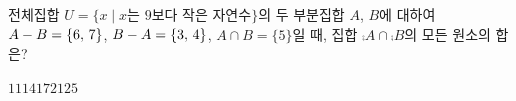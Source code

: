 전체집합 $U=\{x \mid x$는 $9$보다 작은 자연수$\}$의 두 부분집합 $A$, $B$에 대하여 $A-B=\{6,\mkern3mu 7\}$, $B-A=\{3,\mkern3mu 4\}$, $A\cap B=\{5\}$일 때, 집합 $\comp{A}\cap\comp{B}$의 모든 원소의 합은?
\begin{choices32}{$11$}{$14$}{$17$}{$21$}{$25$}\end{choices32}

